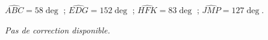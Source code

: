 \exo{}

$\widehat{ABC}=58\deg$ ; $\widehat{EDG}=152\deg$ ; $\widehat{HFK}=83\deg$ ; $\widehat{JMP}=127\deg$.
\exo{}

\textit{Pas de correction disponible.}